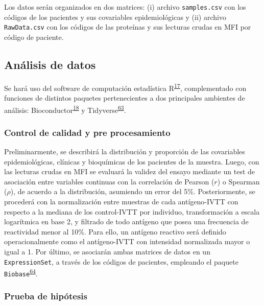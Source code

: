\documentclass[a4paper]{article}
\begin{document}
Los datos serán organizados en dos matrices: (i) archivo
\texttt{samples.csv} con los códigos de los pacientes y sus covariables
epidemiológicas y (ii) archivo \texttt{RawData.csv} con los códigos de
las proteínas y sus lecturas crudas en MFI por código de paciente.

\hypertarget{anadata}{\subsection{Análisis de datos}\label{anadata}}

Se hará uso del software de computación estadística
R\textsuperscript{\protect\hyperlink{ref-R2016}{17}}, complementado con
funciones de distintos paquetes pertenecientes a dos principales
ambientes de análisis:
Bioconductor\textsuperscript{\protect\hyperlink{ref-bioconductor2004}{18}}
y
Tidyverse\textsuperscript{\protect\hyperlink{ref-wickham2016r4ds}{63}}.

\subsubsection{Control de calidad y pre
procesamiento}\label{control-de-calidad-y-pre-procesamiento}

Preliminarmente, se describirá la distribución y proporción de las
covariables epidemiológicas, clínicas y bioquímicas de los pacientes de
la muestra. Luego, con las lecturas crudas en MFI se evaluará la validez
del ensayo mediante un test de asociación entre variables continuas con
la correlación de Pearson (\(r\)) o Spearman (\(\rho\)), de acuerdo a la
distribución, asumiendo un error del 5\%. Posteriormente, se procederá
con la normalización entre muestras de cada antígeno-IVTT con respecto a
la mediana de los control-IVTT por individuo, transformación a escala
logarítmica en base 2, y filtrado de todo antígeno que posea una
frecuencia de reactividad menor al 10\%. Para ello, un antígeno reactivo
será definido operacionalmente como el antígeno-IVTT con intensidad
normalizada mayor o igual a 1. Por último, se asociarán ambas matrices
de datos en un \texttt{ExpressionSet}, a través de los códigos de
pacientes, empleando el paquete
\texttt{Biobase}\textsuperscript{\protect\hyperlink{ref-Biobase}{64}}.

\subsubsection{Prueba de hipótesis}\label{prueba-de-hipotesis}
\end{document}
